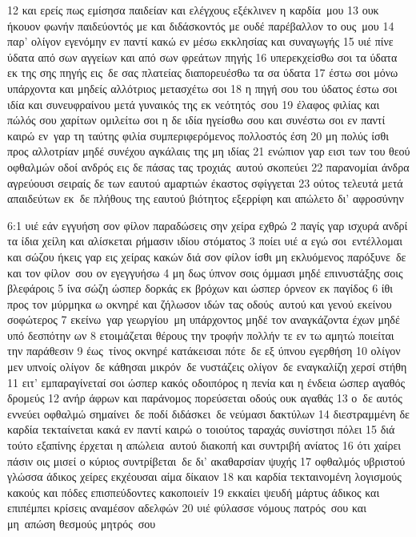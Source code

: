 \documentclass[10pt,oneside,footinclude=true,headinclude=true]{scrbook} %
\begin{document}
12 και ερείς πως εμίσησα παιδείαν και ελέγχους εξέκλινεν η καρδία μου
13 ουκ ήκουον φωνήν παιδεύοντός με και διδάσκοντός με ουδέ παρέβαλλον το ους μου
14 παρ' ολίγον εγενόμην εν παντί κακώ εν μέσω εκκλησίας και συναγωγής
15 υιέ πίνε ύδατα από σων αγγείων και από σων φρεάτων πηγής
16 υπερεκχείσθω σοι τα ύδατα εκ της σης πηγής εις δε σας πλατείας διαπορευέσθω τα σα ύδατα
17 έστω σοι μόνω υπάρχοντα και μηδείς αλλότριος μετασχέτω σοι
18 η πηγή σου του ύδατος έστω σοι ιδία και συνευφραίνου μετά γυναικός της εκ νεότητός σου
19 έλαφος φιλίας και πώλός σου χαρίτων ομιλείτω σοι η δε ιδία ηγείσθω σου και συνέστω σοι εν παντί καιρώ εν γαρ τη ταύτης φιλία συμπεριφερόμενος πολλοστός έση
20 μη πολύς ίσθι προς αλλοτρίαν μηδέ συνέχου αγκάλαις της μη ιδίας
21 ενώπιον γαρ εισι των του θεού οφθαλμών οδοί ανδρός εις δε πάσας τας τροχιάς αυτού σκοπεύει
22 παρανομίαι άνδρα αγρεύουσι σειραίς δε των εαυτού αμαρτιών έκαστος σφίγγεται
23 ούτος τελευτά μετά απαιδεύτων εκ δε πλήθους της εαυτού βιότητος εξερρίφη και απώλετο δι' αφροσύνην
\par
6:1 υιέ εάν εγγυήση σον φίλον παραδώσεις σην χείρα εχθρώ
2 παγίς γαρ ισχυρά ανδρί τα ίδια χείλη και αλίσκεται ρήμασιν ιδίου στόματος
3 ποίει υιέ α εγώ σοι εντέλλομαι και σώζου ήκεις γαρ εις χείρας κακών διά σον φίλον ίσθι μη εκλυόμενος παρόξυνε δε και τον φίλον σου ον εγεγγυήσω
4 μη δως ύπνον σοις όμμασι μηδέ επινυστάξης σοις βλεφάροις
5 ίνα σώζη ώσπερ δορκάς εκ βρόχων και ώσπερ όρνεον εκ παγίδος
6 ίθι προς τον μύρμηκα ω οκνηρέ και ζήλωσον ιδών τας οδούς αυτού και γενού εκείνου σοφώτερος
7 εκείνω γαρ γεωργίου μη υπάρχοντος μηδέ τον αναγκάζοντα έχων μηδέ υπό δεσπότην ων
8 ετοιμάζεται θέρους την τροφήν πολλήν τε εν τω αμητώ ποιείται την παράθεσιν
9 έως τίνος οκνηρέ κατάκεισαι πότε δε εξ ύπνου εγερθήση
10 ολίγον μεν υπνοίς ολίγον δε κάθησαι μικρόν δε νυστάζεις ολίγον δε εναγκαλίζη χερσί στήθη
11 ειτ' εμπαραγίνεταί σοι ώσπερ κακός οδοιπόρος η πενία και η ένδεια ώσπερ αγαθός δρομεύς
12 ανήρ άφρων και παράνομος πορεύσεται οδούς ουκ αγαθάς
13 ο δε αυτός εννεύει οφθαλμώ σημαίνει δε ποδί διδάσκει δε νεύμασι δακτύλων
14 διεστραμμένη δε καρδία τεκταίνεται κακά εν παντί καιρώ ο τοιούτος ταραχάς συνίστησι πόλει
15 διά τούτο εξαπίνης έρχεται η απώλεια αυτού διακοπή και συντριβή ανίατος
16 ότι χαίρει πάσιν οις μισεί ο κύριος συντρίβεται δε δι' ακαθαρσίαν ψυχής
17 οφθαλμός υβριστού γλώσσα άδικος χείρες εκχέουσαι αίμα δίκαιον
18 και καρδία τεκταινομένη λογισμούς κακούς και πόδες επισπεύδοντες κακοποιείν
19 εκκαίει ψευδή μάρτυς άδικος και επιπέμπει κρίσεις αναμέσον αδελφών
20 υιέ φύλασσε νόμους πατρός σου και μη απώση θεσμούς μητρός σου
\end{document}
